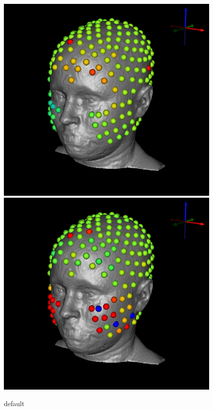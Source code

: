\begin{figure}[H]
\begin{center}
\includegraphics[width=.49\textwidth]{Figures/eeg_1}
\includegraphics[width=.49\textwidth]{Figures/eeg_2}
\caption{default}
\label{default}
\end{center}
\end{figure}